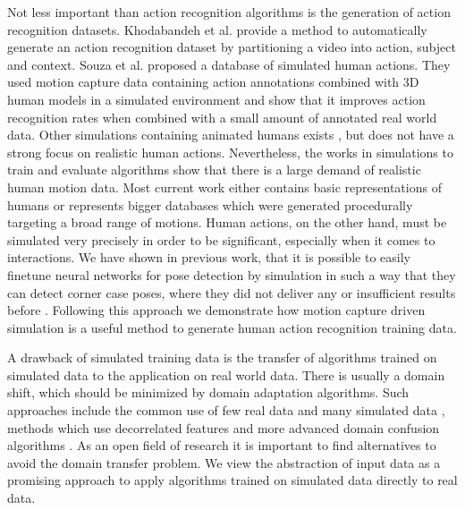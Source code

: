\documentclass[a4paper, 10pt, conference]{ieeeconf}
\begin{document}
Not less important than action recognition algorithms is the generation of action recognition datasets. Khodabandeh et al. \cite{khodabandehDIYHumanAction2018} provide a method to automatically generate an action recognition dataset by partitioning a video into action, subject and context. Souza et al. \cite{desouzaProceduralGenerationVideos2017} proposed a database of simulated human actions. They used motion capture data containing action annotations combined with 3D human models in a simulated environment and show that it improves action recognition rates when combined with a small amount of annotated real world data. Other simulations containing animated humans exists \cite{muellerSim4CVPhotoRealisticSimulator2018, dosovitskiyCARLAOpenUrban2017}, but does not have a strong focus on realistic human actions. Nevertheless, the works in simulations to train and evaluate algorithms show that there is a large demand of realistic human motion data. Most current work either contains basic representations of humans or represents bigger databases which were generated procedurally targeting a broad range of motions. Human actions, on the other hand, must be simulated very precisely in order to be significant, especially when it comes to interactions. We have shown in previous work, that it is possible to easily finetune neural networks for pose detection by simulation in such a way that they can detect corner case poses, where they did not deliver any or insufficient results before \cite{ludlUsingSimulationImprove2018}. Following this approach we demonstrate how motion capture driven simulation is a useful method to generate human action recognition training data.

A drawback of simulated training data is the transfer of algorithms trained on simulated data to the application on real world data. There is usually a domain shift, which should be minimized by domain adaptation algorithms. Such approaches include the common use of few real data and many simulated data \cite{vazquezVirtualRealWorld2014}, methods which use decorrelated features \cite{sunVirtualRealityFast2014} and more advanced domain confusion algorithms \cite{tzengAdversarialDiscriminativeDomain2017}. As an open field of research it is important to find alternatives to avoid the domain transfer problem. We view the abstraction of input data as a promising approach to apply algorithms trained on simulated data directly to real data.
\end{document}
